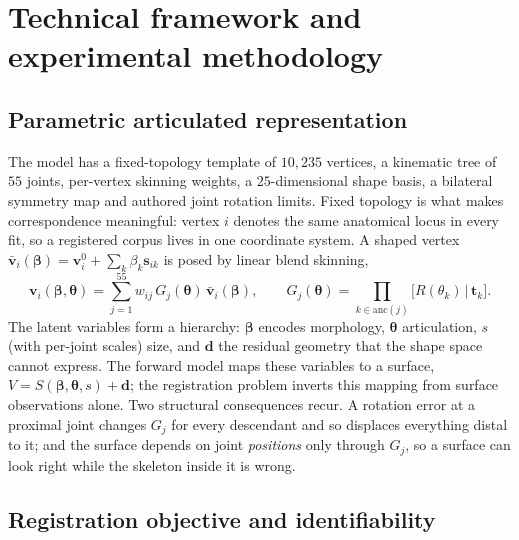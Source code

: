 \section{Technical framework and experimental methodology}
\label{sec:framework}

\subsection{Parametric articulated representation}
\label{sec:representation}

The model has a fixed-topology template of $10{,}235$ vertices, a kinematic
tree of $55$ joints, per-vertex skinning weights, a $25$-dimensional shape
basis, a bilateral symmetry map and authored joint rotation limits. Fixed
topology is what makes correspondence meaningful: vertex $i$ denotes the same
anatomical locus in every fit, so a registered corpus lives in one coordinate
system. A shaped vertex $\bar{\mathbf v}_i(\bm\beta)=\mathbf v^{0}_i+\sum_k\beta_k\mathbf s_{ik}$
is posed by linear blend skinning,
\begin{equation}
\mathbf v_i(\bm\beta,\bm\theta)=\sum_{j=1}^{55} w_{ij}\,G_j(\bm\theta)\,\bar{\mathbf v}_i(\bm\beta),
\qquad G_j(\bm\theta)=\prod_{k\in\mathrm{anc}(j)}\big[R(\theta_k)\,|\,\mathbf t_k\big].
\label{eq:lbs}
\end{equation}
The latent variables form a hierarchy: $\bm\beta$ encodes morphology,
$\bm\theta$ articulation, $s$ (with per-joint scales) size, and $\mathbf d$ the
residual geometry that the shape space cannot express. The forward model maps
these variables to a surface, $V=S(\bm\beta,\bm\theta,s)+\mathbf d$; the
registration problem inverts this mapping from surface observations alone. Two
structural consequences recur. A rotation error at a proximal joint changes
$G_j$ for every descendant and so displaces everything distal to it; and the
surface depends on joint \emph{positions} only through $G_j$, so a surface can
look right while the skeleton inside it is wrong.

\subsection{Registration objective and identifiability}
\label{sec:objective}

